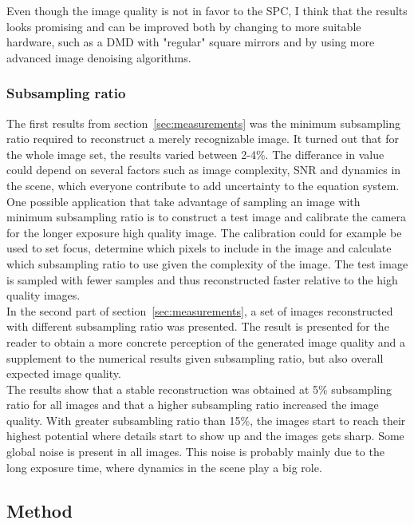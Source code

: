 Even though the image quality is not in favor to the SPC, I think that the results looks promising and can be improved both by changing to more suitable hardware, such as a DMD with "regular" square mirrors and by using more advanced image denoising algorithms.

\subsubsection{Subsampling ratio}
The first results from section~\ref{sec:measurements} was the minimum subsampling ratio required to reconstruct a merely recognizable image. It turned out that for the whole image set, the results varied between 2-4\%. The differance in value could depend on several factors such as image complexity, SNR and dynamics in the scene, which everyone contribute to add uncertainty to the equation system.\\[0.1in]

One possible application that take advantage of sampling an image with minimum subsampling ratio is to construct a test image and calibrate the camera for the longer exposure high quality image. The calibration could for example be used to set focus, determine which pixels to include in the image and calculate which subsampling ratio to use given the complexity of the image. The test image is sampled with fewer samples and thus reconstructed faster relative to the high quality images.\\[0.1in]

In the second part of section~\ref{sec:measurements}, a set of images reconstructed with different subsampling ratio was presented. The result is presented for the reader to obtain a more concrete perception of the generated image quality and a supplement to the numerical results given subsampling ratio, but also overall expected image quality.\\[0.1in]

The results show that a stable reconstruction was obtained at 5\% subsampling ratio for all images and that a higher subsampling ratio increased the image quality. With greater subsambling ratio than 15\%, the images start to reach their highest potential where details start to show up and the images gets sharp. Some global noise is present in all images. This noise is probably mainly due to the long exposure time, where dynamics in the scene play a big role. 

\subsection{Method} %

